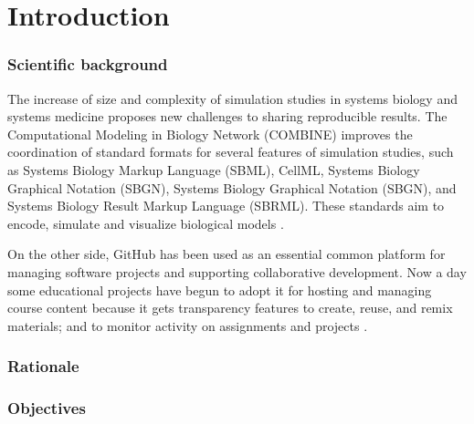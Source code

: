 \section*{Introduction}

\subsubsection*{Scientific background}
The increase of size and complexity of simulation studies in systems biology and systems medicine proposes new challenges to sharing reproducible results. The Computational Modeling in Biology Network (COMBINE) improves the coordination of standard formats for several features of simulation studies, such as Systems Biology Markup Language (SBML), CellML, Systems Biology Graphical Notation (SBGN), Systems Biology Graphical Notation (SBGN), and Systems Biology Result Markup Language (SBRML). These standards aim to encode, simulate and visualize biological models \cite{combine}.

On the other side, GitHub has been used as an essential common platform for managing software projects and supporting collaborative development. Now a day some educational projects have begun to adopt it for hosting and managing course content because it gets transparency features to create, reuse, and remix materials; and to monitor activity on assignments and projects \cite{github}.

\subsubsection*{Rationale}

\subsubsection*{Objectives}
